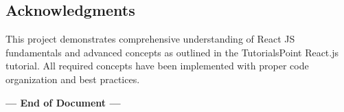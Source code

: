 \documentclass[12pt,a4paper]{article}
\begin{document}
\subsection{Acknowledgments}
This project demonstrates comprehensive understanding of React JS fundamentals and advanced concepts as outlined in the TutorialsPoint React.js tutorial. All required concepts have been implemented with proper code organization and best practices.

\vspace{2cm}

\begin{center}
\textbf{--- End of Document ---}
\end{center}
\end{document}
